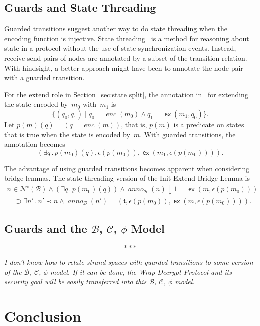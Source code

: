 \documentclass[12pt]{article}
\newenvironment{note}{\begingroup\itshape}{\endgroup}
\newcommand{\cn}[1]{\ensuremath{\operatorname{\mathsf{#1}}}}
\newcommand{\fn}[1]{\ensuremath{\operatorname{\mathit{#1}}}}
\newcommand{\neutral}{\mathord\circ}
\newcommand{\some}[1]{\exists#1\mathpunct.}
\newcommand{\sel}{\downarrow}
\newcommand{\bun}{\ensuremath{\mathcal{B}}}
\newcommand{\nodes}{\ensuremath{\mathcal{N}}}
\newcommand{\nnodes}{\nodes^{\neutral}}
\newcommand{\extend}{\cn{ex}}
\newcommand{\encode}{\fn{enc}}
\newcommand{\comp}{\ensuremath{\mathcal{C}}}
\newcommand{\truth}{\ensuremath{\mathfrak{t}}}
\newcommand{\anno}{\fn{anno}}
\begin{document}
\subsection{Guards and State Threading}\label{sec:guards and state
  threading}

Guarded transitions suggest another way to do state threading when the
encoding function is injective.  State threading~\cite{RamsdellEtAl14}
is a method for reasoning about state in a protocol without the use of
state synchronization events.  Instead, receive-send pairs of nodes
are annotated by a subset of the transition relation.  With hindsight,
a better approach might have been to annotate the node pair with a
guarded transition.

For the extend role in Section~\ref{sec:state split}, the annotation
in~\cite{RamsdellEtAl14} for extending the state encoded by~$m_0$
with~$m_1$ is
\[\{(q_0,q_1)\mid q_0=\encode(m_0)\land q_1=\extend(m_1,q_0)\}.\]
Let $p(m)(q)=(q=\encode(m))$, that is, $p(m)$ is a predicate on states
that is true when the state is encoded by~$m$.  With guarded
transitions, the annotation becomes
%
\[(\some{q}p(m_0)(q),\epsilon(p(m_0)),
\extend(m_1,\epsilon(p(m_0)))).\]

The advantage of using guarded transitions becomes apparent when
considering bridge lemmas.  The state threading version of the Init
Extend Bridge Lemma is
%
\[
\begin{array}{l}
  n\in\nnodes(\bun)\land(\some{q}p(m_0)(q))\land
  \anno_\bun(n)\sel 1=\extend(m,\epsilon(p(m_0)))\\
  \quad\supset\some{n'}n'\prec n\land
  \anno_\bun(n')=(\truth, \epsilon(p(m_0)),\extend(m,\epsilon(p(m_0)))).
\end{array}
\]

\subsection{Guards and the \bun, \comp, $\phi$ Model}\label{sec:guards
  and bcphi}

\[\ast\ast\ast\]

\begin{note}
  I don't know how to relate strand spaces with guarded transitions to
  some version of the \bun, \comp, $\phi$ model.  If it can be done,
  the Wrap-Decrypt Protocol and its security goal will be easily
  transferred into this \bun, \comp, $\phi$ model.
\end{note}

\section{Conclusion}\label{sec:conclusion}
\end{document}
